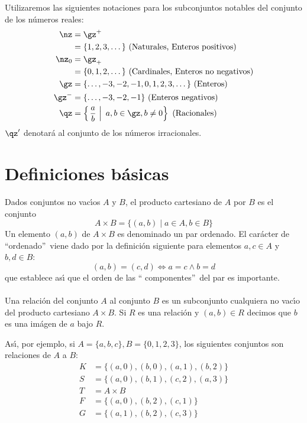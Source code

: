 Utilizaremos las siguientes notaciones para los subconjuntos notables del
conjunto de los n\'{u}meros reales:
\begin{align*}
\nz  &  =\gz^{+}\\
&  =\{1,2,3,\dots\}\ \mbox{(Naturales, Enteros positivos)}\\
\nz_{0}  &  =\gz_{+}\\
&  =\{0,1,2,\dots\}\ \mbox{(Cardinales, Enteros no negativos)}\\
\gz  &  =\{\dots,-3,-2,-1,0,1,2,3,\dots\}\ \mbox{(Enteros)}\\
\gz^{-}  &  =\{\dots,-3,-2,-1\}\ \mbox{(Enteros negativos)}\\
\qz  &  =\left\{  \left.  \frac{a}{b}\ \right\vert \ a,b\in\gz,b\neq0\right\}
\ \mbox{(Racionales)}
\end{align*}
$\qz^{\prime}$ denotar\'{a} al conjunto de los n\'{u}meros irracionales.


\section{Definiciones b\'{a}sicas}

Dados conjuntos no vac\'{\i}os $A$ y $B$, el producto cartesiano
de $A$ por $B$ es el conjunto
\begin{equation}
A\times B=\{(a,b)\mid a\in A,b\in B\}
\end{equation}
Un elemento $(a,b)$ de $A\times B$ es denominado un par ordenado. El
car\'{a}cter de \textquotedblleft ordenado\textquotedblright\ viene dado por
la definici\'{o}n siguiente para elementos $a,c\in A$ y $b,d\in B$:
\[
(a,b)=(c,d)\Longleftrightarrow a=c\wedge b=d
\]
que establece as\'{\i} que el orden de las \textquotedblleft
componentes\textquotedblright\ del par es importante.

\paragraph{}

Una
relaci\'{o}n del conjunto $A$ al conjunto $B$ es un subconjunto cualquiera no
vac\'{\i}o del producto cartesiano $A\times B$. Si $R$ es una relaci\'{o}n y
$(a,b)\in R$ decimos que $b$ es una im\'{a}gen de $a$ bajo $R$.

\begin{example}
\label{ejemplouno} As\'{\i}, por ejemplo, si $A=\{a,b,c\},B=\{0,1,2,3\}$, los
si\-guientes conjuntos son relaciones de $A$ a $B$:
\begin{align*}
K  &  =\{(a,0),(b,0),(a,1),(b,2)\}\\
S  &  =\{(a,0),(b,1),(c,2),(a,3)\}\\
T  &  =A\times B\\
F  &  =\{(a,0),(b,2),(c,1)\}\\
G  &  =\{(a,1),(b,2),(c,3)\}
\end{align*}

\end{example}


